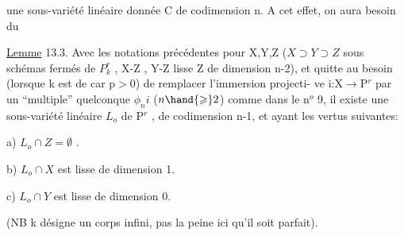 
une sous-variété linéaire donnée C  de codimension n.  A cet effet,
on aura besoin du

\uline{Lemme} 13.3.  Avec les notations précédentes pour  X,Y,Z  ($X\supset Y\supset Z$
sous schémas fermés de $P^r_k$ , X-Z\hand{,} ,
Y-Z lisse \hand{,} Z de dimension \hand{$\leqslant$}n-2), et quitte
au besoin (lorsque k est de car p$>$0)  de remplacer l'immersion projecti-%
ve  i:X$\rightarrow$P$^r$  par  un ``multiple'' quelconque $\phi_n i$ ($n \hand{\geqslant} 2$)  comme dans le
n$^o$ 9,  il existe une sous-variété linéaire  $L_o$ de P$^r$ , de codimension
n-1, et ayant les vertus suivantes:

a)  $L_o \cap Z = \emptyset$ .

b)  $L_o \cap X$  est lisse de dimension 1.

c)  $L_o \cap Y$   est lisse de dimension  0.

(NB  k désigne un corps infini, pas la peine ici qu'il soit parfait).

